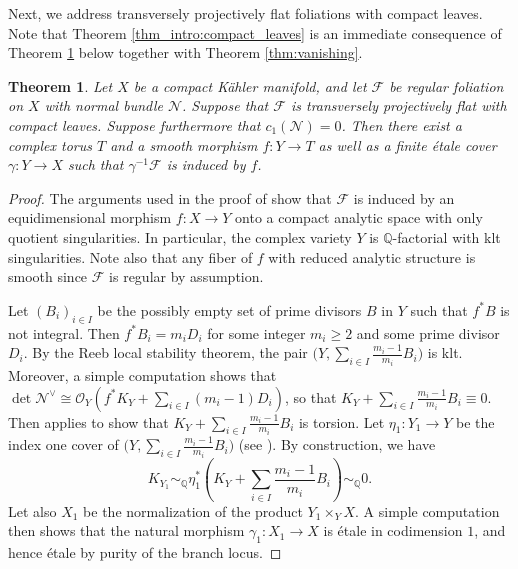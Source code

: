 \documentclass[english,10pt]{amsart}
\renewcommand{\ge}{\geqslant}
\newcommand{\cF}{\mathcal{F}}
\newcommand{\sN}{\mathscr{N}}
\newcommand{\sO}{\mathscr{O}}
\newtheorem{thm}{Theorem}[section]
\theoremstyle{definition}
\theoremstyle{remark}
\numberwithin{equation}{section}
\begin{document}
Next, we address transversely projectively flat foliations with compact leaves. Note that Theorem \ref{thm_intro:compact_leaves} is an immediate consequence of Theorem \ref{thm:compact_leaves} below together with Theorem \ref{thm:vanishing}.

\begin{thm}\label{thm:compact_leaves}
Let $X$ be a compact K\"ahler manifold, and let $\cF$ be regular foliation on $X$ with normal bundle $\sN$. Suppose that $\cF$ is transversely projectively flat with compact leaves. Suppose furthermore that $c_1(\sN)=0$. Then there exist a complex torus $T$ and a smooth morphism $f \colon Y \to T$ as well as a finite \'etale cover $\gamma\colon Y \to X$ such that $\gamma^{-1}\cF$ is induced by $f$. 
\end{thm}

\begin{proof}
The arguments used in the proof of \cite[Corollary 2.11]{hoering_split} show that $\cF$ is induced by an equidimensional morphism $f \colon X \to Y$ onto a compact analytic space with only quotient singularities. In particular, the complex variety $Y$ is $\mathbb{Q}$-factorial with klt singularities. Note also that any fiber of $f$ with reduced analytic structure is smooth since $\cF$ is regular by assumption.

Let $(B_i)_{i \in I}$ be the possibly empty set of prime divisors $B$ in $Y$ such that $f^*B$ is not integral. Then $f^*B_i=m_i D_i$ for some integer $m_i \ge 2$ and some prime divisor $D_i$. By the Reeb local stability theorem, the pair $\big(Y,\sum_{i\in I}\frac{m_i-1}{m_i}B_i\big)$ is klt. Moreover, a simple computation shows that $\det \sN^\vee \cong \sO_Y(f^*K_Y+\sum_{i\in I}(m_i-1) D_i)$, so that $K_Y+\sum_{i\in I}\frac{m_i-1}{m_i}B_i \equiv 0$. Then \cite[Corollary 1.18]{cao_guenancia_paun_2023} applies to show that $K_Y+\sum_{i\in I}\frac{m_i-1}{m_i}B_i$ is torsion. Let $\eta_1 \colon Y_1 \to Y$ be the index one cover of $\big(Y,\sum_{i\in I}\frac{m_i-1}{m_i}B_i\big)$
(see \cite[Section 2.4]{shokurov_log_flips}). By construction, we have
\[
K_{Y_1} \sim_\mathbb{Q} \eta_1^*\left(K_Y+\sum_{i\in I}\frac{m_i-1}{m_i}B_i\right) \sim_\mathbb{Q} 0.
\]
Let also $X_1$ be the normalization of the product $Y_1 \times_Y X$. A simple computation then shows that the natural morphism $\gamma_1 \colon X_1 \to X$ is \'etale in codimension $1$, and hence \'etale by purity of the branch locus.


\end{proof}
\end{document}
